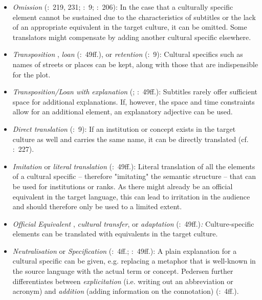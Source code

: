 \sloppy
\begin{itemize}
\item \textit{Omission} (\citealt{nedergaard-larsen1993}:~219, 231; \citealt{pedersen2005}:~9; \citealt{Diaz_cintas2007}:~206): In the case that a culturally specific element cannot be sustained due to the characteristics of subtitles or the lack of an appropriate equivalent in the target culture, it can be omitted. Some translators might compensate by adding another cultural specific elsewhere.
\item \textit{Transposition} \citep{Karamitroglou1998}, \textit{loan} (\citealt{Leisner2009}:~49ff.), or \textit{retention} (\citealt{pedersen2005}:~9): Cultural specifics such as names of streets or places can be kept, along with those that are indispensible for the plot.
\item \textit{Transposition/Loan with explanation} (\citealt{Karamitroglou1998}; \citealt{Leisner2009}:~49ff.): Subtitles rarely offer sufficient space for additional explanations. If, however, the space and time constraints allow for an additional element, an explanatory adjective can be used.
\item \textit{Direct translation} (\citealt{pedersen2005}:~9): If an institution or concept exists in the target culture as well and carries the same name, it can be directly translated (cf. \citealt{nedergaard-larsen1993}:~227).
\item \textit{Imitation} \citep[9]{pedersen2005} or \textit{literal translation} (\citealt{Leisner2009}:~49ff.): Literal translation of all the elements of a cultural specific – therefore "imitating" the semantic structure – that can be used for institutions or ranks. As there might already be an official equivalent in the target language, this can lead to irritation in the audience and should therefore only be used to a limited extent.
\item \textit{Official Equivalent} \citep{pedersen2005}, \textit{cultural transfer}, or \textit{adaptation} (\citealt{Leisner2009}:~49ff.)\textit{:} Culture-specific elements can be translated with equivalents in the target culture.
\item \textit{Neutralisation} or \textit{Specification} (\citealt{pedersen2005}:~4ff.; \citealt{Leisner2009}:~49ff.): A plain explanation for a cultural specific can be given, e.g. replacing a metaphor that is well-known in the source language with the actual term or concept. Pedersen further differentiates between \textit{explicitation} (i.e. writing out an abbreviation or acronym) and \textit{addition} (adding information on the connotation) (\citealt{pedersen2005}:~4ff.).

\end{itemize}
